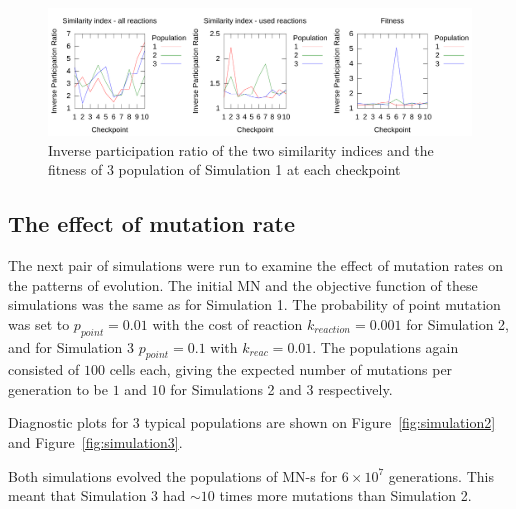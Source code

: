 \documentclass[a4paper,12pt]{article}
\begin{document}
\begin{figure}[htpb]
	\centering
	\includegraphics[width=1\linewidth]{IPR_sim1.pdf}
	\caption{Inverse participation ratio of the two similarity indices and the fitness of $3$ population of Simulation 1 at each checkpoint}
	\label{fig:IPRsim1}
\end{figure}


\subsection{The effect of mutation rate}
\label{sub:the_probability_of_the_mutations}

The next pair of simulations were run to examine the effect of mutation rates on the patterns of evolution. The initial MN and the objective function of these simulations was the same as for Simulation 1. The probability of point mutation was set to $p_{point}=0.01$ with the cost of reaction $k_{reaction}=0.001$ for Simulation 2, and for Simulation 3 $p_{point}=0.1$ with $k_{reac}=0.01$. The populations again consisted of $100$ cells each, giving the expected number of mutations per generation to be $1$ and $10$ for Simulations 2 and 3 respectively. 

Diagnostic plots for $3$ typical populations are shown on Figure~\ref{fig:simulation2} and Figure~\ref{fig:simulation3}.

Both simulations evolved the populations of MN-s for $6\times 10^7$ generations. This meant that Simulation 3 had $\sim10$ times more mutations than Simulation 2. 
\end{document}

